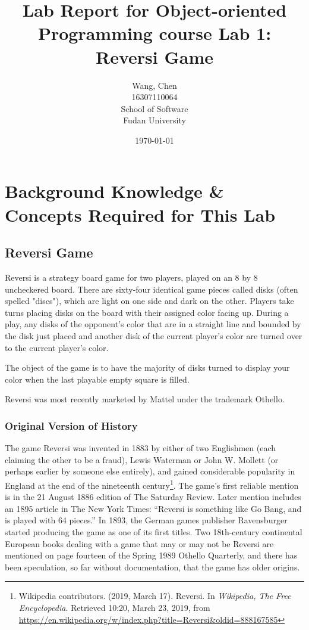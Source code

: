 \documentclass[a4paper]{report}
\title{Lab Report for Object-oriented Programming course \newline
 Lab 1: Reversi Game}
\author{Wang, Chen \\ 16307110064 \\ School of Software\\ Fudan University}
\date{\today}
\begin{document}
\maketitle

\tableofcontents

\chapter{Background Knowledge \& Concepts Required for This Lab}
\section{Reversi Game}
Reversi is a strategy board game for two players, played on an 8 by 8 uncheckered board. There are sixty-four identical game pieces called disks (often spelled "discs"), which are light on one side and dark on the other. Players take turns placing disks on the board with their assigned color facing up. During a play, any disks of the opponent's color that are in a straight line and bounded by the disk just placed and another disk of the current player's color are turned over to the current player's color. 
\par
The object of the game is to have the majority of disks turned to display your color when the last playable empty square is filled. 
\par
Reversi was most recently marketed by Mattel under the trademark Othello. 

\subsection{Original Version of History}
The game Reversi was invented in 1883 by either of two Englishmen (each claiming the other to be a fraud), Lewis Waterman or John W. Mollett (or perhaps earlier by someone else entirely), and gained considerable popularity in England at the end of the nineteenth century\footnote{Wikipedia contributors. (2019, March 17). Reversi. In \emph{Wikipedia, The Free Encyclopedia}. Retrieved 10:20, March 23, 2019, from \url{https://en.wikipedia.org/w/index.php?title=Reversi&oldid=888167585}}. The game's first reliable mention is in the 21 August 1886 edition of The Saturday Review. Later mention includes an 1895 article in The New York Times: ``Reversi is something like Go Bang, and is played with 64 pieces.'' In 1893, the German games publisher Ravensburger started producing the game as one of its first titles. Two 18th-century continental European books dealing with a game that may or may not be Reversi are mentioned on page fourteen of the Spring 1989 Othello Quarterly, and there has been speculation, so far without documentation, that the game has older origins.
\end{document}
